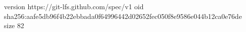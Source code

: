 version https://git-lfs.github.com/spec/v1
oid sha256:aafe5db96f4b22ebbada0f64996442d02652fec050f8e9586e044b12ca0e76de
size 82
